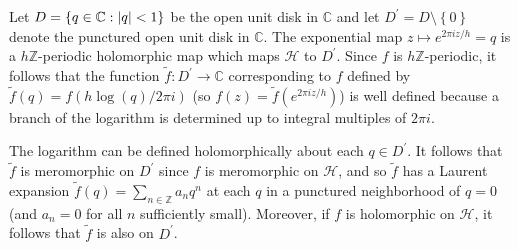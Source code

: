 \documentclass[10pt,leqno,twoside,b5paper]{article}
\theoremstyle{plain}
\theoremstyle{definition}
\numberwithin{equation}{section}
\numberwithin{lem}{section}
\newcommand{\cbr}[1]{\left\{#1\right\}}
\begin{document}
Let $D = \cbr{q\in\mathbb C : \abs{q} <1}$ be the open unit disk in $\mathbb C$ and let $D^\prime = D \setminus \!\cbr{0}$ denote the punctured open unit disk in $\mathbb C$. The exponential map $z\mapsto e^{2\pi i z/h} = q$ is a $h\mathbb{Z}$-periodic holomorphic map which maps $\mathcal H$ to $D^\prime$. Since $f$ is $h\mathbb{Z}$-periodic, it follows that the function $\tilde f\colon D^\prime\to\mathbb C$ corresponding to $f$ defined by $\tilde f(q) = f(h\log (q)/2\pi i)$ (so $f(z) = \tilde f(e^{2\pi i z/h})$) is well defined because a branch of the logarithm is determined up to integral multiples of $2\pi i$.

The logarithm can be defined holomorphically about each $q\in D^\prime$. It follows that $\tilde f$ is meromorphic on $D^\prime$ since $f$ is meromorphic on $\mathcal H$, and so $\tilde f$ has a Laurent expansion $\tilde f(q) = \sum_{n\in\mathbb Z}a_nq^n$ at each $q$ in a punctured neighborhood of $q=0$ (and $a_n = 0$ for all $n$ sufficiently small). Moreover, if $f$ is holomorphic on $\mathcal H$, it follows that $\tilde f$ is also on $D^\prime$.
\end{document}
